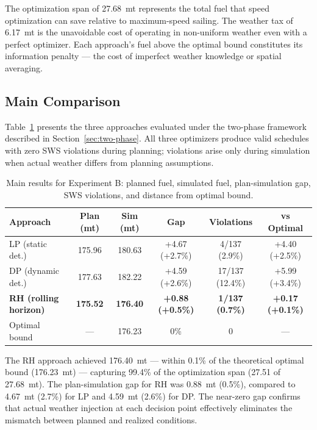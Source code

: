\documentclass[review]{elsarticle}
\begin{document}
The optimization span of 27.68~mt represents the total fuel that speed optimization can save relative to maximum-speed sailing. The weather tax of 6.17~mt is the unavoidable cost of operating in non-uniform weather even with a perfect optimizer. Each approach's fuel above the optimal bound constitutes its information penalty --- the cost of imperfect weather knowledge or spatial averaging.

\subsection{Main Comparison}
\label{sec:results-main}

Table~\ref{tab:main-expb} presents the three approaches evaluated under the two-phase framework described in Section~\ref{sec:two-phase}. All three optimizers produce valid schedules with zero SWS violations during planning; violations arise only during simulation when actual weather differs from planning assumptions.

\begin{table}[htbp]
\centering
\caption{Main results for Experiment B: planned fuel, simulated fuel, plan-simulation gap, SWS violations, and distance from optimal bound.}
\label{tab:main-expb}
\begin{tabular}{lccccc}
\toprule
Approach & Plan (mt) & Sim (mt) & Gap & Violations & vs Optimal \\
\midrule
LP (static det.) & 175.96 & 180.63 & +4.67 (+2.7\%) & 4/137 (2.9\%) & +4.40 (+2.5\%) \\
DP (dynamic det.) & 177.63 & 182.22 & +4.59 (+2.6\%) & 17/137 (12.4\%) & +5.99 (+3.4\%) \\
\textbf{RH (rolling horizon)} & \textbf{175.52} & \textbf{176.40} & \textbf{+0.88 (+0.5\%)} & \textbf{1/137 (0.7\%)} & \textbf{+0.17 (+0.1\%)} \\
\midrule
Optimal bound & --- & 176.23 & 0\% & 0 & --- \\
\bottomrule
\end{tabular}
\end{table}

The RH approach achieved 176.40~mt --- within 0.1\% of the theoretical optimal bound (176.23~mt) --- capturing 99.4\% of the optimization span (27.51 of 27.68~mt). The plan-simulation gap for RH was 0.88~mt (0.5\%), compared to 4.67~mt (2.7\%) for LP and 4.59~mt (2.6\%) for DP. The near-zero gap confirms that actual weather injection at each decision point effectively eliminates the mismatch between planned and realized conditions.
\end{document}
